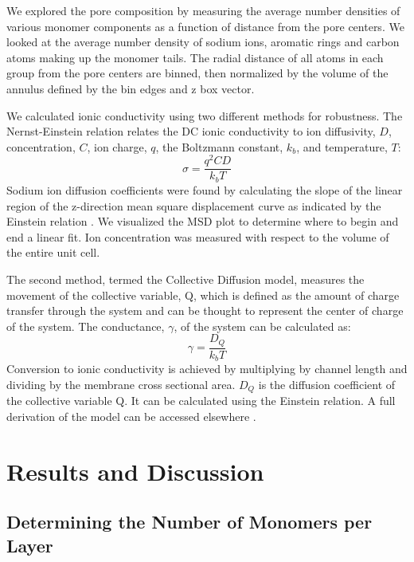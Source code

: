 \documentclass{article}
\begin{document}
  We explored the pore composition by measuring the average number densities of
  various monomer components as a function of distance from the pore centers.  We
  looked at the average number density of sodium ions, aromatic rings and carbon
  atoms making up the monomer tails. The radial distance of all atoms in each
  group from the pore centers are binned, then normalized by the volume of the
  annulus defined by the bin edges and z box vector.

  We calculated ionic conductivity using two different methods for robustness.
  The Nernst-Einstein relation relates the DC ionic conductivity to ion
  diffusivity, $D$, concentration, $C$, ion charge, $q$, the Boltzmann constant,
  $k_b$, and temperature, $T$: $$\sigma = \dfrac{q^2CD}{k_b T}$$ 
  Sodium ion diffusion coefficients were found by calculating the slope
  of the linear region of the z-direction mean square displacement curve as
  indicated by the Einstein relation \cite{einstein_investigations_1956}. We
  visualized the MSD plot to determine where to begin and end a linear fit. Ion
  concentration was measured with respect to the volume of the entire unit cell. 

  The second method, termed the Collective Diffusion model, measures the
  movement of the collective variable, Q, which is defined as the amount of
  charge transfer through the system and can be thought to represent the center
  of charge of the system. The conductance, $\gamma$, of the system can be
  calculated as: $$ \gamma = \dfrac{D_Q}{k_b T} $$ Conversion to ionic
  conductivity is achieved by multiplying by channel length and dividing by the
  membrane cross sectional area.  $D_Q$ is the diffusion coefficient of the
  collective variable Q. It can be calculated using the Einstein relation.  A
  full derivation of the model can be accessed elsewhere 
  \cite{liu_collective_2013}.

  \section{Results and Discussion}
  
  \subsection{Determining the Number of Monomers per Layer}
\end{document}

